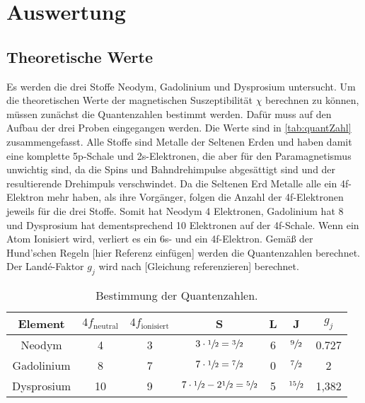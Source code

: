 \section{Auswertung}
\label{sec:Auswertung}
\subsection{Theoretische Werte}
\label{subsec:theoW}
Es werden die drei Stoffe Neodym, Gadolinium und Dysprosium untersucht. Um die theoretischen Werte der magnetischen Suszeptibilität $\chi$ berechnen zu können, müssen zunächst die Quantenzahlen bestimmt werden.
Dafür muss auf den Aufbau der drei Proben eingegangen werden. Die Werte sind in \autoref{tab:quantZahl} zusammengefasst.
Alle Stoffe sind Metalle der Seltenen Erden und haben damit eine komplette 5p-Schale und 2s-Elektronen, die aber für den Paramagnetismus unwichtig sind, da die Spins und Bahndrehimpulse abgesättigt sind
und der resultierende Drehimpuls verschwindet. Da die Seltenen Erd Metalle alle ein 4f-Elektron mehr haben, als ihre Vorgänger, folgen die Anzahl der 4f-Elektronen jeweils für die drei Stoffe.
Somit hat Neodym 4 Elektronen, Gadolinium hat 8  und Dysprosium hat dementsprechend 10 Elektronen auf der 4f-Schale.
Wenn ein Atom Ionisiert wird, verliert es ein 6s- und ein 4f-Elektron.
Gemäß der Hund'schen Regeln [hier Referenz einfügen] werden die Quantenzahlen berechnet.
Der Landé-Faktor $g_j$ wird nach [Gleichung referenzieren] berechnet.

\begin{table}[H]
  \centering
  \caption{Bestimmung der Quantenzahlen.}
  \label{tab:quantZahl}
  \begin{tabular}{c| c c c c c c}
    \toprule
    Element & $4f_{\text{neutral}}$ & $4f_{\text{ionisiert}}$ & S & L & J & $g_j$\\
    \midrule
    Neodym & 4 & 3 & $3\cdot\sfrac{1}{2}=\sfrac{3}{2}$ & 6 & $\sfrac{9}{2}$ & 0.727 \\
    Gadolinium & 8 & 7 & $7\cdot\sfrac{1}{2}=\sfrac{7}{2}$ & 0 & $\sfrac{7}{2}$ & 2 \\
    Dysprosium & 10 & 9 & $7\cdot\sfrac{1}{2}-2\sfrac{1}{2}=\sfrac{5}{2}$ & 5 & $\sfrac{15}{2}$ & 1,382 \\
    \bottomrule
  \end{tabular}
\end{table}

